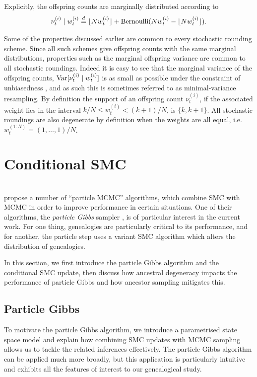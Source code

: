 Explicitly, the offspring counts are marginally distributed according to 
\begin{equation*}
\nu_t^{(i)} \mid w_t^{(i)}
\overset{d}{=} \lfloor N w_t^{(i)} \rfloor + \operatorname{Bernoulli}( Nw_t^{(i)} - \lfloor N w_t^{(i)} \rfloor ) .
\end{equation*}

Some of the properties discussed earlier are common to every stochastic rounding scheme. 
Since all such schemes give offspring counts with the same marginal distributions, properties such as the marginal offspring variance are common to all stochastic roundings. Indeed it is easy to see that the marginal variance of the offspring counts, $\operatorname{Var}[ \nu_t^{(i)} \mid w_t^{(i)} ]$ is as small as possible under the constraint of unbiasedness , and as such this is sometimes referred to as minimal-variance resampling.
By definition the support of an offspring count $\nu_t^{(i)}$, if the associated weight lies in the interval $k/N \leq w_t^{(i)} < (k+1)/N$, is $\{ k, k+1\}$. 
All stochastic roundings are also degenerate by definition when the weights are all equal, i.e.\ $w_t^{(1:N)} = (1,\dots, 1)/N$.





\section{Conditional SMC \seb{$\checkmark$} }
\label{sec:condSMC}
\\
\textcite{andrieu2010} propose a number of ``particle MCMC'' algorithms, which combine SMC with MCMC in order to improve performance in certain situations.
One of their algorithms, the \emph{particle Gibbs} sampler \parencite[Section 2.4.3]{andrieu2010}, is of particular interest in the current work. For one thing, genealogies are particularly critical to its performance, and for another, the particle step uses a variant SMC algorithm which alters the distribution of genealogies.

In this section, we first introduce the particle Gibbs algorithm and the conditional SMC update, then discuss how ancestral degeneracy impacts the performance of particle Gibbs and how ancestor sampling mitigates this.




\subsection{Particle Gibbs}
To motivate the particle Gibbs algorithm, we introduce a parametrised state space model and explain how combining SMC updates with MCMC sampling allows us to tackle the related inferences effectively.
The particle Gibbs algorithm can be applied much more broadly, but this application is particularly intuitive and exhibits all the features of interest to our genealogical study.

